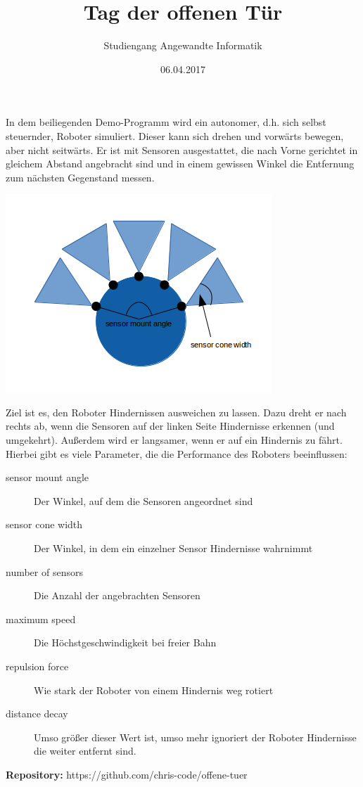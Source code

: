 \documentclass[11pt, a4paper]{article}
\title{Tag der offenen Tür}
\author{Studiengang Angewandte Informatik}
\date{06.04.2017}
\begin{document}
\maketitle

In dem beiliegenden Demo-Programm wird ein autonomer, d.h. sich selbst steuernder, Roboter simuliert. Dieser kann sich drehen und vorwärts bewegen, aber nicht seitwärts. Er ist mit Sensoren ausgestattet, die nach Vorne gerichtet in gleichem Abstand angebracht sind und in einem gewissen Winkel die Entfernung zum nächsten Gegenstand messen.

\begin{center}
	\includegraphics{robot.png}
\end{center}

Ziel ist es, den Roboter Hindernissen ausweichen zu lassen. Dazu dreht er nach rechts ab, wenn die Sensoren auf der linken Seite Hindernisse erkennen (und umgekehrt). Außerdem wird er langsamer, wenn er auf ein Hindernis zu fährt. Hierbei gibt es viele Parameter, die die Performance des Roboters beeinflussen:

\begin{description}
	\item[sensor mount angle] Der Winkel, auf dem die Sensoren angeordnet sind
	\item[sensor cone width] Der Winkel, in dem ein einzelner Sensor Hindernisse wahrnimmt
	\item[number of sensors] Die Anzahl der angebrachten Sensoren
	\item[maximum speed] Die Höchstgeschwindigkeit bei freier Bahn
	\item[repulsion force] Wie stark der Roboter von einem Hindernis weg rotiert
	\item[distance decay] Umso größer dieser Wert ist, umso mehr ignoriert der Roboter Hindernisse die weiter entfernt sind.
\end{description}

\vspace{1cm}

\textbf{Repository:} https://github.com/chris-code/offene-tuer
\end{document}
